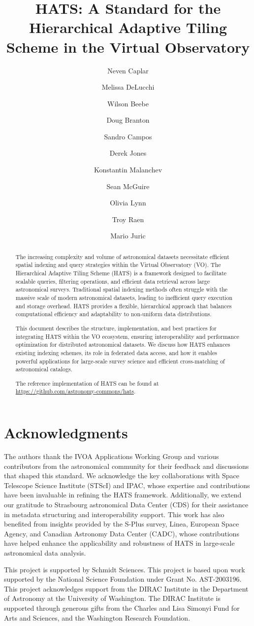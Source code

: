 \documentclass[11pt,a4paper]{ivoa}
\title{HATS: A Standard for the Hierarchical Adaptive Tiling Scheme in the Virtual Observatory}
\author[https://www.ivoa.net/authors/caplar]{Neven Caplar}
\author[https://www.ivoa.net/authors/delucchi]{Melissa DeLucchi}
\author[https://www.ivoa.net/authors/beebe]{Wilson Beebe}
\author[https://www.ivoa.net/authors/branton]{Doug Branton}
\author[https://www.ivoa.net/authors/campos]{Sandro Campos}
\author[https://www.ivoa.net/authors/jones]{Derek Jones}
\author[https://www.ivoa.net/authors/malanchev]{Konstantin Malanchev}
\author[https://www.ivoa.net/authors/mcguire]{Sean McGuire}
\author[https://www.ivoa.net/authors/lynn]{Olivia Lynn}
\author[https://www.ivoa.net/authors/raen]{Troy Raen}
\author[https://www.ivoa.net/authors/juric]{Mario Juric}
\begin{document}
\begin{abstract}
The increasing complexity and volume of astronomical datasets necessitate efficient spatial indexing and query strategies within the Virtual Observatory (VO). 
The Hierarchical Adaptive Tiling Scheme (HATS) is a framework designed to facilitate scalable queries, filtering operations, and efficient data retrieval across large astronomical surveys. 
Traditional spatial indexing methods often struggle with the massive scale of modern astronomical datasets, leading to inefficient query execution and storage overhead. 
HATS provides a flexible, hierarchical approach that balances computational efficiency and adaptability to non-uniform data distributions.\par

This document describes the structure, implementation, and best practices for integrating HATS within the VO ecosystem, ensuring interoperability and performance optimization for distributed astronomical datasets. We discuss how HATS enhances existing indexing schemes, its role in federated data access, and how it enables powerful applications for large-scale survey science and efficient cross-matching of astronomical catalogs. \par 
The reference implementation of HATS can be found at \url{https://github.com/astronomy-commons/hats}. 

\end{abstract}

\section*{Acknowledgments}
The authors thank the IVOA Applications Working Group and various contributors from the astronomical community for their feedback and discussions that shaped this standard. 
We acknowledge the key collaborations with Space Telescope Science Institute (STScI) and IPAC, whose expertise and contributions have been invaluable in refining the HATS framework. 
Additionally, we extend our gratitude to  Strasbourg astronomical Data Center (CDS) for their assistance in metadata structuring and interoperability support. 
This work has also benefited from insights provided by the S-Plus survey, Linea, European Space Agency, and Canadian Astronomy Data Center (CADC), whose contributions have helped enhance the applicability and robustness of HATS in large-scale astronomical data analysis. \par

This project is supported by Schmidt Sciences.
This project is based upon work supported by the National Science Foundation under Grant No. AST-2003196.
This project acknowledges support from the DIRAC Institute in the Department of Astronomy at the University of Washington. The DIRAC Institute is supported through generous gifts from the Charles and Lisa Simonyi Fund for Arts and Sciences, and the Washington Research Foundation.
\end{document}
